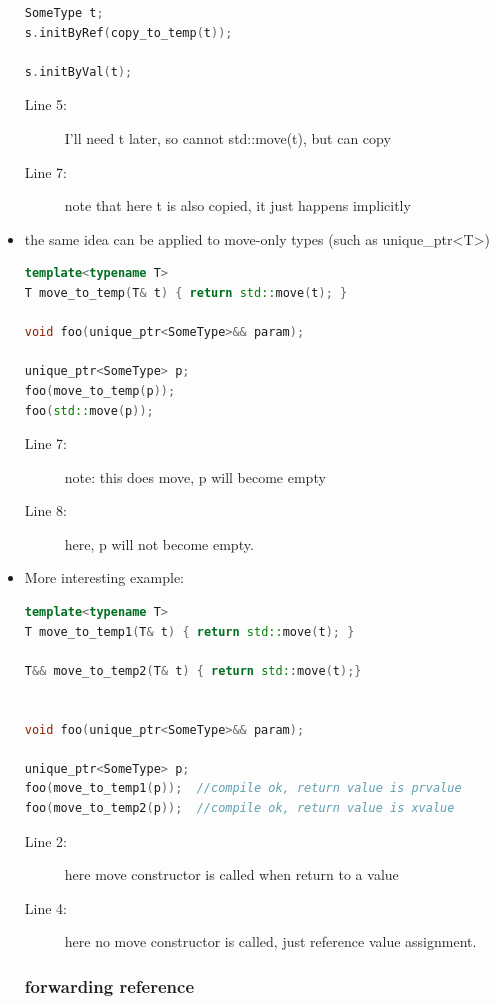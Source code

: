 \documentclass[a4paper,11pt,twoside]{book}
\begin{document}
\begin{itemize}
\begin{lstlisting}[frame=single, language=c++]
SomeType t; 
s.initByRef(copy_to_temp(t)); 

s.initByVal(t); 
\end{lstlisting}
\begin{description}
	\item[Line 5:] I'll need t later, so cannot std::move(t), but can copy
	\item[Line 7:] note that here t is also copied, it just happens implicitly
\end{description}

\item the same idea can be applied to move-only types (such as unique\_ptr<T>)
\begin{lstlisting}[frame=single, language=c++]
template<typename T>
T move_to_temp(T& t) { return std::move(t); }

void foo(unique_ptr<SomeType>&& param);

unique_ptr<SomeType> p;
foo(move_to_temp(p)); 
foo(std::move(p)); 
\end{lstlisting}
\begin{description}
	\item[Line 7:] note: this does move, p will become empty
	\item[Line 8:] here, p will not become empty. 
\end{description}


\item More interesting example:
\begin{lstlisting}[frame=single, language=c++]
template<typename T>
T move_to_temp1(T& t) { return std::move(t); }

T&& move_to_temp2(T& t) { return std::move(t);}


void foo(unique_ptr<SomeType>&& param);

unique_ptr<SomeType> p;
foo(move_to_temp1(p));  //compile ok, return value is prvalue
foo(move_to_temp2(p));  //compile ok, return value is xvalue
\end{lstlisting}
\begin{description}
	\item[Line 2:] here move constructor is called when return to a value
	\item[Line 4:] here no move constructor is called, just reference value assignment.
\end{description}


\subsubsection{forwarding reference}


\end{itemize}
\end{document}
